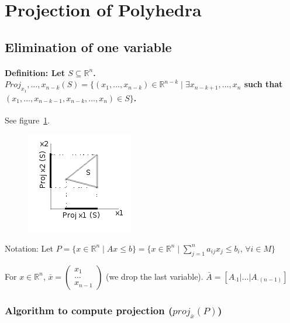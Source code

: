\documentclass[main]{subfiles}
\begin{document}

\section{Projection of Polyhedra}

\subsection{Elimination of one variable}
\paragraph{Definition: Let $S \subseteq \mathbb{R}^{n}$. $Proj_{x_{1}}, \dots,
x_{n-k} (S) = \{ (x_{1}, \dots, x_{n-k}) \in \mathbb{R}^{n-k} \mid \exists
x_{n-k+1}, \dots, x_{n}$ such that $(x_{1}, \dots, x_{n-k -1}, x_{n-k}, \dots,
x_{n}) \in S \}$.} See figure~\ref{fig:projection}. \\

\begin{figure}[!h]
  \label{fig:projection}
  \centering
    \includegraphics{imgs/projection.png}
\end{figure}

Notation: Let $P = \{x \in \mathbb{R}^n \mid Ax \leq b\} = \{x \in \mathbb{R}^n
\mid \sum_{j = 1}^{n} a_{ij}x_{j} \leq b_{i}$, $\forall i \in M \}$

For $x \in \mathbb{R}^n$, $\bar{x} =
\begin{pmatrix}
	x_1 \\
    \dots \\
    x_{n-1}
\end{pmatrix}$ (we drop the last variable).
$\bar{A} = [A_{\cdot 1} | \dots | A_{\cdot (n-1)}]$

\subsubsection{Algorithm to compute projection ($proj_{\bar{x}}(P)$)}
\end{document}
